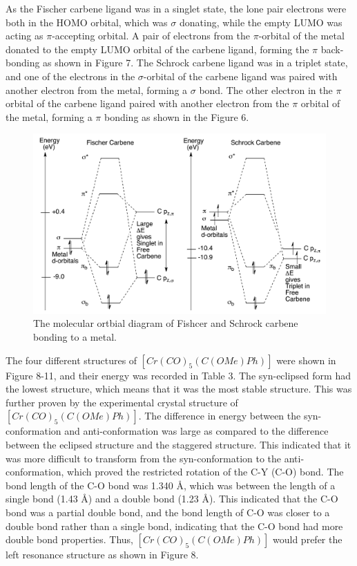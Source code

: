 \documentclass[twocolumn]{article} %
\begin{document}
As the Fischer carbene ligand was in a singlet state, the lone pair electrons were both in the HOMO orbital, which was $\sigma$ donating, while the empty LUMO was acting as $\pi$-accepting orbital. A pair of electrons from the $\pi$-orbital of the metal donated to the empty LUMO orbital of the carbene ligand, forming the $\pi$ back-bonding as shown in Figure 7.
The Schrock carbene ligand was in a triplet state, and one of the electrons in the $\sigma$-orbital of the carbene ligand was paired with another electron from the metal, forming a $\sigma$ bond. The other electron in the $\pi$ orbital of the carbene ligand paired with another electron from the $\pi$ orbital of the metal, forming a $\pi$ bonding as shown in the Figure 6.

\begin{figure}[h!]
      \centering
      \includegraphics[width=0.95\columnwidth]{MO diagram.png} %
      \vspace{2mm} %
      \caption{The molecular ortbial diagram of Fishcer and Schrock carbene bonding to a metal.}
\end{figure}


The four different structures of $[Cr(CO)_5(C(OMe)Ph)]$ were shown in Figure 8-11, and their energy was recorded in Table 3. The syn-eclipsed form had the lowest structure, which means that it was the most stable structure. This was further proven by the experimental crystal structure of $[Cr(CO)_5(C(OMe)Ph)]$. The difference in energy between the syn-conformation and anti-conformation was large as compared to the difference between the eclipsed structure and the staggered structure. This indicated that it was more difficult to transform from the syn-conformation to the anti-conformation, which proved the restricted rotation of the C-Y (C-O) bond. The bond length of the C-O bond was 1.340 Å, which was between the length of a single bond (1.43 Å) and a double bond (1.23 Å).\cite{book1} This indicated that the C-O bond was a partial double bond, and the bond length of C-O was closer to a double bond rather than a single bond, indicating that the C-O bond had more double bond properties. Thus, $[Cr(CO)_5(C(OMe)Ph)]$ would prefer the left resonance structure as shown in Figure 8.
\end{document}
